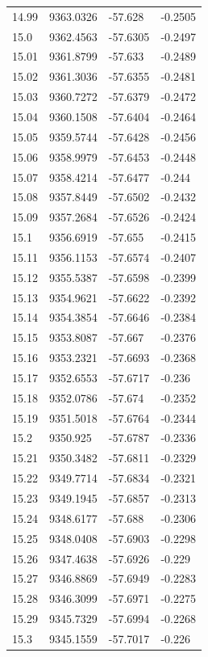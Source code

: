 \begin{table}[H]
\begin{tabular}{llll}
14.99 & 9363.0326 & -57.628 & -0.2505 \\
15.0 & 9362.4563 & -57.6305 & -0.2497 \\
15.01 & 9361.8799 & -57.633 & -0.2489 \\
15.02 & 9361.3036 & -57.6355 & -0.2481 \\
15.03 & 9360.7272 & -57.6379 & -0.2472 \\
15.04 & 9360.1508 & -57.6404 & -0.2464 \\
15.05 & 9359.5744 & -57.6428 & -0.2456 \\
15.06 & 9358.9979 & -57.6453 & -0.2448 \\
15.07 & 9358.4214 & -57.6477 & -0.244 \\
15.08 & 9357.8449 & -57.6502 & -0.2432 \\
15.09 & 9357.2684 & -57.6526 & -0.2424 \\
15.1 & 9356.6919 & -57.655 & -0.2415 \\
15.11 & 9356.1153 & -57.6574 & -0.2407 \\
15.12 & 9355.5387 & -57.6598 & -0.2399 \\
15.13 & 9354.9621 & -57.6622 & -0.2392 \\
15.14 & 9354.3854 & -57.6646 & -0.2384 \\
15.15 & 9353.8087 & -57.667 & -0.2376 \\
15.16 & 9353.2321 & -57.6693 & -0.2368 \\
15.17 & 9352.6553 & -57.6717 & -0.236 \\
15.18 & 9352.0786 & -57.674 & -0.2352 \\
15.19 & 9351.5018 & -57.6764 & -0.2344 \\
15.2 & 9350.925 & -57.6787 & -0.2336 \\
15.21 & 9350.3482 & -57.6811 & -0.2329 \\
15.22 & 9349.7714 & -57.6834 & -0.2321 \\
15.23 & 9349.1945 & -57.6857 & -0.2313 \\
15.24 & 9348.6177 & -57.688 & -0.2306 \\
15.25 & 9348.0408 & -57.6903 & -0.2298 \\
15.26 & 9347.4638 & -57.6926 & -0.229 \\
15.27 & 9346.8869 & -57.6949 & -0.2283 \\
15.28 & 9346.3099 & -57.6971 & -0.2275 \\
15.29 & 9345.7329 & -57.6994 & -0.2268 \\
15.3 & 9345.1559 & -57.7017 & -0.226 \\

\end{tabular}
\end{table}
